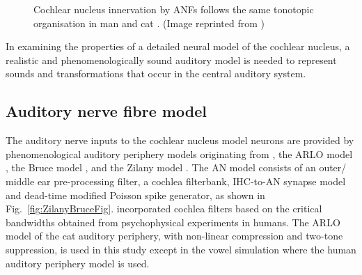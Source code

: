 
\begin{figure}[htb]
  \begin{center}
    \caption[Tonotopic innervation by ANFs in the CN of man and cat.]{Cochlear nucleus innervation by ANFs follows the same tonotopic organisation in man and cat
\citep{RyugoParks:2003,Ryugo:1992,Spoendlin:1973}. (Image reprinted from \citep{})}
    \label{fig:CN_Cat_Human}
  \end{center}
\end{figure}




%

In examining the properties of a detailed neural model of the cochlear nucleus, a realistic and phenomenologically sound auditory model is needed to represent sounds and transformations that occur in the central auditory system.

%






\subsection{Auditory nerve fibre model   \label{sec:CN:resp-audit-models}}

The auditory nerve inputs to the cochlear nucleus model neurons are provided by
phenomenological auditory periphery models originating from \citet{Carney:1993},
the ARLO model \citep{HeinzZhangEtAl:2001}, the Bruce model
\citep{BruceSachsEtAl:2003, ZilanyBruce:2006, ZilanyBruce:2007}, and the Zilany
model \citep{ZilanyBruceEtAl:2009}.  The AN model consists of an outer\slash
middle ear pre-processing filter, a cochlea filterbank, IHC-to-AN synapse model
and dead-time modified Poisson spike generator, as shown in
Fig.~\ref{fig:ZilanyBruceFig}.  \citet{HeinzZhangEtAl:2001} incorporated cochlea
filters based on the critical bandwidths obtained from psychophysical
experiments in humans.  The ARLO model of the cat auditory periphery, with
non-linear compression and two-tone suppression, is used in this study except in
the vowel simulation where the human auditory periphery model is used.

